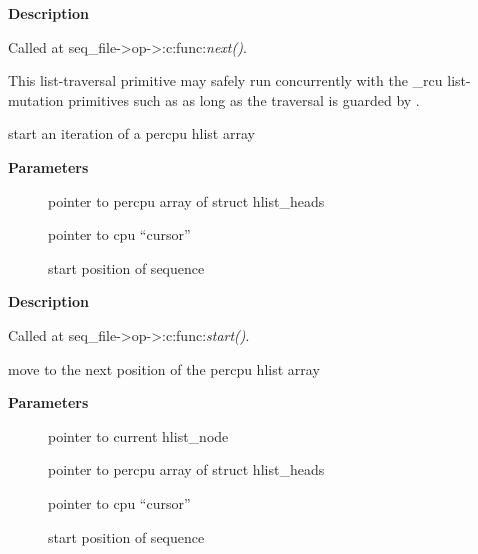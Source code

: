 \documentclass[a4paper,8pt,english]{sphinxmanual}
\begin{document}
\textbf{Description}

Called at seq\_file-\textgreater{}op-\textgreater{}:c:func:\emph{next()}.

This list-traversal primitive may safely run concurrently with
the \_rcu list-mutation primitives such as 
as long as the traversal is guarded by .

\begin{fulllineitems}
\label{filesystems/index:c.seq_hlist_start_percpu}
start an iteration of a percpu hlist array

\end{fulllineitems}


\textbf{Parameters}
\begin{description}
\item[{}] \leavevmode
pointer to percpu array of struct hlist\_heads

\item[{}] \leavevmode
pointer to cpu ``cursor''

\item[{}] \leavevmode
start position of sequence

\end{description}

\textbf{Description}

Called at seq\_file-\textgreater{}op-\textgreater{}:c:func:\emph{start()}.

\begin{fulllineitems}
\label{filesystems/index:c.seq_hlist_next_percpu}
move to the next position of the percpu hlist array

\end{fulllineitems}


\textbf{Parameters}
\begin{description}
\item[{}] \leavevmode
pointer to current hlist\_node

\item[{}] \leavevmode
pointer to percpu array of struct hlist\_heads

\item[{}] \leavevmode
pointer to cpu ``cursor''

\item[{}] \leavevmode
start position of sequence

\end{description}
\end{document}
